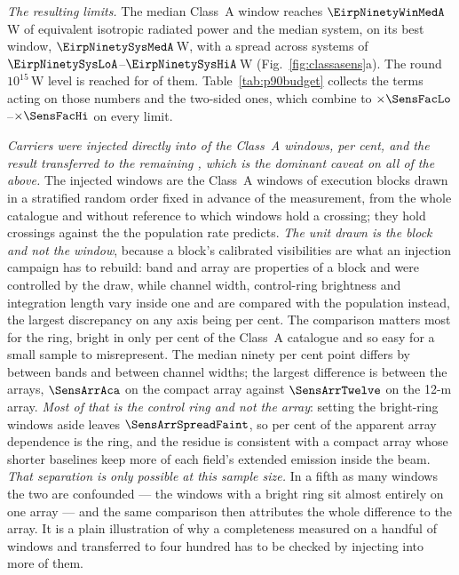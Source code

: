\emph{The resulting limits.} The median Class~A window reaches
$\EirpNinetyWinMedA$\,W of equivalent isotropic radiated power and the median
system, on its best window, $\EirpNinetySysMedA$\,W, with a spread across
systems of $\EirpNinetySysLoA$--$\EirpNinetySysHiA$\,W
(Fig.~\ref{fig:classasens}a). The round $10^{15}$\,W level is reached for
\NSysEfifteen{} of them. Table~\ref{tab:p90budget} collects the terms acting
on those numbers and the two-sided ones, which combine to
$\times\SensFacLo$--$\times\SensFacHi$ on every limit.

\emph{Carriers were injected directly into \SensNInj{} of the \NWinA{}
Class~A windows, \SensNInjPct{} per cent, and the result transferred to the
remaining \SensNTransfer, which is the dominant caveat on all of the above.}
The injected windows are the Class~A windows of execution blocks drawn in a
stratified random order fixed in advance of the measurement, from the whole
catalogue and without reference to which windows hold a crossing; they hold
\SensNCrossAch{} crossings against the \SensNCrossExp{} the population rate
predicts. \emph{The unit drawn is the block and not the window}, because a
block's calibrated visibilities are what an injection campaign has to
rebuild: band and array are properties of a block and were controlled by the
draw, while channel width, control-ring brightness and integration length
vary inside one and are compared with the population instead, the largest
discrepancy on any axis being \SensCovWorstPct{} per cent. The comparison
matters most for the ring, bright in only \SensRingCatPct{} per cent of the
Class~A catalogue and so easy for a small sample to misrepresent. The median ninety per cent point differs by
\SensBandSpread{} between bands and \SensChanSpread{} between channel widths;
the largest difference is between the arrays, $\SensArrAca$ on the compact
array against $\SensArrTwelve$ on the 12-m array. \emph{Most of that is the
control ring and not the array}: setting the bright-ring windows aside leaves
$\SensArrSpreadFaint$, so \SensArrRingSharePct{} per cent of the apparent
array dependence is the ring, and the residue is consistent with a compact
array whose shorter baselines keep more of each field's extended emission
inside the beam. \emph{That separation is only possible at this sample size.}
In a fifth as many windows the two are confounded --- the windows with a
bright ring sit almost entirely on one array --- and the same comparison then
attributes the whole difference to the array. It is a plain illustration of
why a completeness measured on a handful of windows and transferred to four
hundred has to be checked by injecting into more of them.

